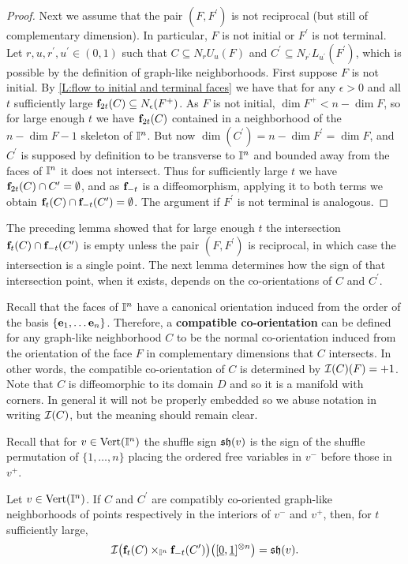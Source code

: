 \begin{proof}
	Next we assume that the pair $(F,F^\prime)$ is not reciprocal (but still of complementary dimension).
	In particular, $F$ is not initial or $F^\prime$ is not terminal.
	Let $r,u,r^\prime,u^\prime \in (0,1)$ such that $C \subseteq N_rU_u(F)$ and $C^\prime \subseteq N_{r^\prime}L_{u^\prime}(F^\prime)$, which is possible by the definition of graph-like neighborhoods.
	First suppose $F$ is not initial.
	By \cref{L:flow to initial and terminal faces} we have that for any $\epsilon > 0$ and all $t$ sufficiently large $\mathbf{f}_{2t}(C) \subseteq N_\epsilon(F^+)$.
	As $F$ is not initial, $\dim F^+ < n-\dim F$, so for large enough $t$ we have $\mathbf{f}_{2t}(C)$ contained in a neighborhood of the $n-\dim F-1$ skeleton of $\mathbb{I}^n$.
	But now $\dim(C^\prime) = n-\dim F^\prime = \dim F$, and $C^\prime$ is supposed by definition to be transverse to $\mathbb{I}^n$ and bounded away from the faces of $\mathbb{I}^n$ it does not intersect.
	Thus for sufficiently large $t$ we have $\mathbf{f}_{2t}(C)\cap C^\prime = \emptyset$, and as $\mathbf{f}_{-t}$ is a diffeomorphism, applying it to both terms we obtain $\mathbf{f}_{t}(C) \cap \mathbf{f}_{-t} (C^\prime) = \emptyset$.
	The argument if $F^\prime$ is not terminal is analogous.
\end{proof}

The preceding lemma showed that for large enough $t$ the intersection $\mathbf{f}_t(C) \cap \mathbf{f}_{-t}(C^\prime)$ is empty unless the pair $(F,F^\prime)$ is reciprocal, in which case the intersection is a single point.
The next lemma determines how the sign of that intersection point, when it exists, depends on the co-orientations of $C$ and $C^\prime$.

Recall that the faces of $\mathbb{I}^n$ have a canonical orientation induced from the order of the basis $\{\mathbf{e}_1, \dots \mathbf{e}_n\}$.
Therefore, a \textbf{compatible co-orientation} can be defined for any graph-like neighborhood $C$ to be the normal co-orientation induced from the orientation of the face $F$ in complementary dimensions that $C$ intersects.
In other words, the compatible co-orientation of $C$ is determined by $\mathcal{I}(C)(F) = +1$.
Note that $C$ is diffeomorphic to its domain $D$ and so it is a manifold with corners.
In general it will not be properly embedded so we abuse notation in writing $\mathcal{I}(C)$, but the meaning should remain clear.

Recall that for $v \in {\rm Vert}(\mathbb{I}^n)$ the shuffle sign $\mathfrak{sh}(v)$ is the sign of the shuffle permutation of $\{1, \dots, n\}$ placing the ordered free variables in $v^-$ before those in $v^+$.

\begin{lemma}\label{L:sign for graph-like nbhds intersection}
	Let $v \in {\rm Vert}(\mathbb{I}^n)$.
	If $C$ and $C^\prime$ are compatibly co-oriented graph-like neighborhoods of points respectively in the interiors of $v^-$ and $v^+$, then, for $t$ sufficiently large,
	\begin{equation}
		\label{E:sign flow intersection graph-like 1}
		\mathcal{I} \big( \mathbf{f}_t(C) \times_{\mathbb{I}^n} \mathbf{f}_{-t}(C^\prime) \big)
		\big( [\underline{0}, \underline{1}]^{\otimes n} \big) = \mathfrak{sh}(v).\\
	\end{equation}
\end{lemma}

